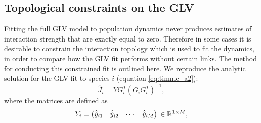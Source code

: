 %

\subsection{Topological constraints on the GLV}
\label{sec:top_const}

Fitting the full GLV model to population dynamics never produces estimates of interaction strength that are exactly equal to zero. Therefore in some cases it is desirable to constrain the interaction topology which is used to fit the dynamics, in order to compare how the GLV fit performs without certain links. The method for conducting this constrained fit is outlined here. We reproduce the analytic solution for the GLV fit to species $i$ (equation \ref{eq:timme_a2}):
\begin{equation}
\hat{J}_i = YG^T_i\left(G_iG^T_i\right)^{-1},
\end{equation}
where the matrices are defined as
\begin{equation}\label{eq:timme888}
Y_{i} = 
\begin{pmatrix}
  \hat{\dot{y}}_{i1} & \hat{\dot{y}}_{i2} & \cdots & \hat{\dot{y}}_{iM}
\end{pmatrix}\\
\in{\mathbb{R}^{1 \times M}},
\end{equation}


